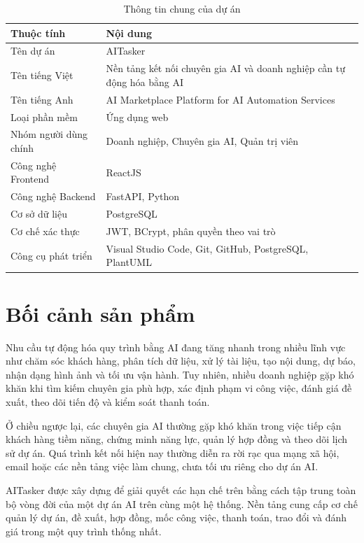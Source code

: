 \begin{table}[H]
    \centering
    \caption{Thông tin chung của dự án}
    \label{tab:project-information}
    \begin{tabular}{|p{4.2cm}|p{9.2cm}|}
        \hline
        \textbf{Thuộc tính} & \textbf{Nội dung} \\ \hline
        Tên dự án & AITasker \\ \hline
        Tên tiếng Việt & Nền tảng kết nối chuyên gia AI và doanh nghiệp cần tự động hóa bằng AI \\ \hline
        Tên tiếng Anh & AI Marketplace Platform for AI Automation Services \\ \hline
        Loại phần mềm & Ứng dụng web \\ \hline
        Nhóm người dùng chính & Doanh nghiệp, Chuyên gia AI, Quản trị viên \\ \hline
        Công nghệ Frontend & ReactJS \\ \hline
        Công nghệ Backend & FastAPI, Python \\ \hline
        Cơ sở dữ liệu & PostgreSQL \\ \hline
        Cơ chế xác thực & JWT, BCrypt, phân quyền theo vai trò \\ \hline
        Công cụ phát triển & Visual Studio Code, Git, GitHub, PostgreSQL, PlantUML \\ \hline
    \end{tabular}
\end{table}

\section{Bối cảnh sản phẩm}
\label{sec:product-background}

Nhu cầu tự động hóa quy trình bằng AI đang tăng nhanh trong nhiều lĩnh vực như chăm sóc khách hàng, phân tích dữ liệu, xử lý tài liệu, tạo nội dung, dự báo, nhận dạng hình ảnh và tối ưu vận hành. Tuy nhiên, nhiều doanh nghiệp gặp khó khăn khi tìm kiếm chuyên gia phù hợp, xác định phạm vi công việc, đánh giá đề xuất, theo dõi tiến độ và kiểm soát thanh toán.

Ở chiều ngược lại, các chuyên gia AI thường gặp khó khăn trong việc tiếp cận khách hàng tiềm năng, chứng minh năng lực, quản lý hợp đồng và theo dõi lịch sử dự án. Quá trình kết nối hiện nay thường diễn ra rời rạc qua mạng xã hội, email hoặc các nền tảng việc làm chung, chưa tối ưu riêng cho dự án AI.

AITasker được xây dựng để giải quyết các hạn chế trên bằng cách tập trung toàn bộ vòng đời của một dự án AI trên cùng một hệ thống. Nền tảng cung cấp cơ chế quản lý dự án, đề xuất, hợp đồng, mốc công việc, thanh toán, trao đổi và đánh giá trong một quy trình thống nhất.

